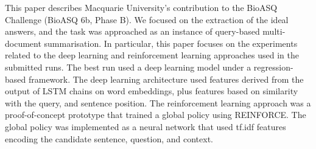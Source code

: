 This paper describes Macquarie University's contribution to the BioASQ Challenge (BioASQ 6b, Phase B). We focused on the extraction of the ideal answers, and the task was approached as an instance of query-based multi-document summarisation. In particular, this paper focuses on the experiments related to the deep learning and reinforcement learning approaches used in the submitted runs. The best run used a deep learning model under a regression-based framework. The deep learning architecture used features derived from the output of LSTM chains on word embeddings, plus features based on similarity with the query, and sentence position. The reinforcement learning approach was a proof-of-concept prototype that trained a global policy using REINFORCE. The global policy was implemented as a neural network that used tf.idf features encoding the candidate sentence, question, and context.

